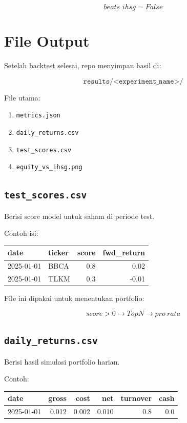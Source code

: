 \documentclass[11pt,a4paper]{article}
\begin{document}
\[
beats\_ihsg = False
\]

\section{File Output}

Setelah backtest selesai, repo menyimpan hasil di:

\[
\texttt{results/<experiment\_name>/}
\]

File utama:

\begin{enumerate}[leftmargin=*]
    \item \texttt{metrics.json}
    \item \texttt{daily\_returns.csv}
    \item \texttt{test\_scores.csv}
    \item \texttt{equity\_vs\_ihsg.png}
\end{enumerate}

\subsection{\texttt{test\_scores.csv}}

Berisi score model untuk saham di periode test.

Contoh isi:

\begin{center}
\begin{tabular}{llrr}
\toprule
date & ticker & score & fwd\_return \\
\midrule
2025-01-01 & BBCA & 0.8 & 0.02 \\
2025-01-01 & TLKM & 0.3 & -0.01 \\
\bottomrule
\end{tabular}
\end{center}

File ini dipakai untuk menentukan portfolio:

\[
score > 0
\rightarrow
TopN
\rightarrow
pro\ rata
\]

\subsection{\texttt{daily\_returns.csv}}

Berisi hasil simulasi portfolio harian.

Contoh:

\begin{center}
\begin{tabular}{lrrrrr}
\toprule
date & gross & cost & net & turnover & cash \\
\midrule
2025-01-01 & 0.012 & 0.002 & 0.010 & 0.8 & 0.0 \\
\bottomrule
\end{tabular}
\end{center}
\end{document}
